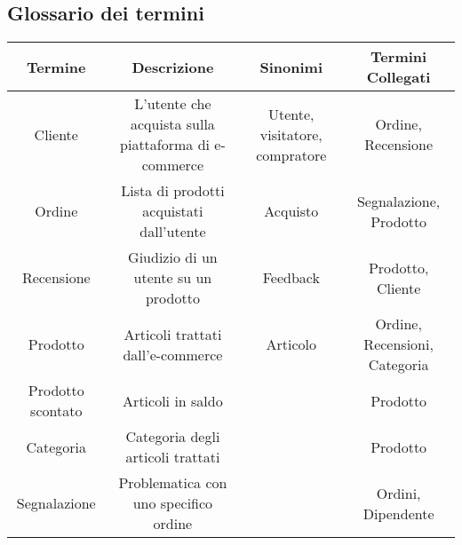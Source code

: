 \subsection{Glossario dei termini}
\begin{center}
\begin{tabular}{ |c|c|c|c|} 
\hline
Termine & Descrizione & Sinonimi & Termini Collegati \\
\hline
\multirow{3}{6em}{Cliente} & \multirow{3}{12em}{L'utente che acquista sulla piattaforma di e-commerce} & \multirow{3}{8em}{Utente, visitatore, compratore} & \multirow{3}{12em}{Ordine, Recensione} \\
 &  &  & \\
 &  &  & \\
\hline

\multirow{3}{6em}{Ordine} & \multirow{3}{12em}{Lista di prodotti acquistati dall'utente} & \multirow{3}{8em}{Acquisto} & \multirow{3}{12em}{Segnalazione, Prodotto} \\
 &  &  & \\
 &  &  & \\
\hline

\multirow{3}{6em}{Recensione} & \multirow{3}{12em}{Giudizio di un utente su un prodotto} & \multirow{3}{8em}{Feedback} & \multirow{3}{12em}{Prodotto, Cliente} \\
 &  &  & \\
 &  &  & \\ 
\hline

\multirow{3}{6em}{Prodotto} & \multirow{3}{12em}{Articoli trattati dall'e-commerce} & \multirow{3}{8em}{Articolo} & \multirow{3}{12em}{Ordine, Recensioni, Categoria} \\
&  &  & \\
&  &  & \\ 
\hline

\multirow{3}{6em}{Prodotto scontato} & \multirow{3}{12em}{Articoli in saldo} & \multirow{3}{8em}{} & \multirow{3}{12em}{Prodotto} \\
&  &  & \\
&  &  & \\ 
\hline

\multirow{3}{6em}{Categoria} & \multirow{3}{12em}{Categoria degli articoli trattati} & \multirow{3}{8em}{} & \multirow{3}{12em}{Prodotto} \\
&  &  & \\
&  &  & \\ 
\hline


\multirow{3}{6em}{Segnalazione} & \multirow{3}{12em}{Problematica con uno specifico ordine} & \multirow{3}{8em}{} & \multirow{3}{12em}{Ordini, Dipendente} \\
&  &  & \\
&  &  & \\ 
\hline


\end{tabular}
\end{center}
